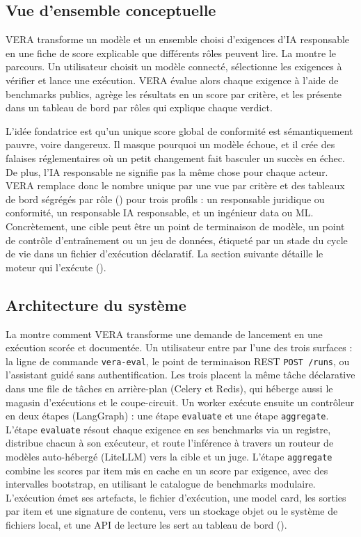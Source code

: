 \documentclass[10pt,conference]{IEEEtran}
\begin{document}
\subsection{Vue d'ensemble conceptuelle}
VERA transforme un modèle et un ensemble choisi d'exigences d'IA responsable en une fiche de score explicable que différents rôles peuvent lire.
La  montre le parcours.
Un utilisateur choisit un modèle connecté, sélectionne les exigences à vérifier et lance une exécution.
VERA évalue alors chaque exigence à l'aide de benchmarks publics, agrège les résultats en un score par critère, et les présente dans un tableau de bord par rôles qui explique chaque verdict.

L'idée fondatrice est qu'un unique score global de conformité est sémantiquement pauvre, voire dangereux.
Il masque pourquoi un modèle échoue, et il crée des falaises réglementaires où un petit changement fait basculer un succès en échec.
De plus, l'IA responsable ne signifie pas la même chose pour chaque acteur.
VERA remplace donc le nombre unique par une vue par critère et des tableaux de bord ségrégés par rôle () pour trois profils : un responsable juridique ou conformité, un responsable IA responsable, et un ingénieur data ou ML.
Concrètement, une cible peut être un point de terminaison de modèle, un point de contrôle d'entraînement ou un jeu de données, étiqueté par un stade du cycle de vie dans un fichier d'exécution déclaratif.
La section suivante détaille le moteur qui l'exécute ().

\subsection{Architecture du système}
La  montre comment VERA transforme une demande de lancement en une exécution scorée et documentée.
Un utilisateur entre par l'une des trois surfaces : la ligne de commande \texttt{vera-eval}, le point de terminaison REST \texttt{POST /runs}, ou l'assistant guidé sans authentification.
Les trois placent la même tâche déclarative dans une file de tâches en arrière-plan (Celery et Redis), qui héberge aussi le magasin d'exécutions et le coupe-circuit.
Un worker exécute ensuite un contrôleur en deux étapes (LangGraph) : une étape \texttt{evaluate} et une étape \texttt{aggregate}.
L'étape \texttt{evaluate} résout chaque exigence en ses benchmarks via un registre, distribue chacun à son exécuteur, et route l'inférence à travers un routeur de modèles auto-hébergé (LiteLLM) vers la cible et un juge.
L'étape \texttt{aggregate} combine les scores par item mis en cache en un score par exigence, avec des intervalles bootstrap, en utilisant le catalogue de benchmarks modulaire.
L'exécution émet ses artefacts, le fichier d'exécution, une model card, les sorties par item et une signature de contenu, vers un stockage objet ou le système de fichiers local, et une API de lecture les sert au tableau de bord ().
\end{document}
